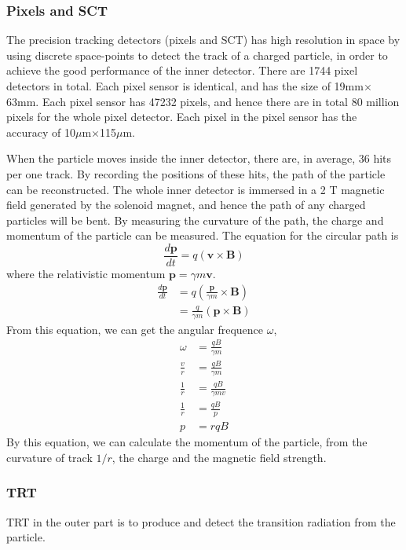 \subsubsection{Pixels and SCT}
The precision tracking detectors (pixels and SCT) has high resolution in space by using discrete space-points to detect the track of a charged particle, in order to achieve the good performance of the inner detector.
There are 1744 pixel detectors in total.
Each pixel sensor is identical, and has the size of 19mm$\times$63mm.
Each pixel sensor has 47232 pixels, and hence there are in total 80 million pixels for the whole pixel detector.
Each pixel in the pixel sensor has the accuracy of 10$\mu$m$\times$115$\mu$m.

When the particle moves inside the inner detector, there are, in average, 36 hits per one track.
By recording the positions of these hits, the path of the particle can be reconstructed.
The whole inner detector is immersed in a 2 T magnetic field generated by the solenoid magnet, and hence the path of any charged particles will be bent.
By measuring the curvature of the path, the charge and momentum of the particle can be measured.
The equation for the circular path is
\begin{equation}
\frac{d\mathbf{p}}{dt} = q(\mathbf{v} \times \mathbf{B})
\end{equation}
where the relativistic momentum $\mathbf{p} = \gamma m \mathbf{v}$.
\begin{align}
\frac{d\mathbf{p}}{dt} &= q( \frac{\mathbf{p}}{\gamma m} \times \mathbf{B}) \\
&= \frac{q}{\gamma m} (\mathbf{p} \times \mathbf{B})
\end{align}
From this equation, we can get the angular frequence $\omega$,
\begin{align}
\omega &= \frac{qB}{\gamma m} \\
\frac{v}{r} &= \frac{qB}{\gamma m} \\
\frac{1}{r} &= \frac{qB}{\gamma m v} \\
\frac{1}{r} &= \frac{qB}{p} \\
p &= rqB
\end{align}
By this equation, we can calculate the momentum of the particle, from the curvature of track $1/r$, the charge and the magnetic field strength.

\subsubsection{TRT}
TRT in the outer part is to produce and detect the transition radiation from the particle.
